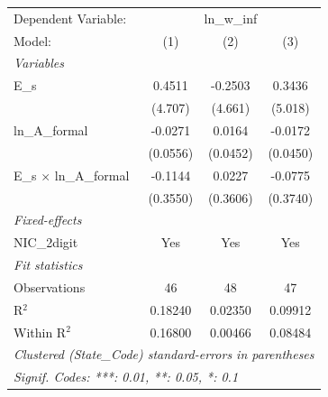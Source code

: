 
\begingroup
\centering
\begin{tabular}{lccc}
   \tabularnewline \midrule \midrule
   Dependent Variable: & \multicolumn{3}{c}{ln\_w\_inf}\\
   Model:                          & (1)      & (2)      & (3)\\  
   \midrule
   \emph{Variables}\\
   E\_s                            & 0.4511   & -0.2503  & 0.3436\\   
                                   & (4.707)  & (4.661)  & (5.018)\\   
   ln\_A\_formal                   & -0.0271  & 0.0164   & -0.0172\\   
                                   & (0.0556) & (0.0452) & (0.0450)\\   
   E\_s $\times$ ln\_A\_formal     & -0.1144  & 0.0227   & -0.0775\\   
                                   & (0.3550) & (0.3606) & (0.3740)\\   
   \midrule
   \emph{Fixed-effects}\\
   NIC\_2digit                     & Yes      & Yes      & Yes\\  
   \midrule
   \emph{Fit statistics}\\
   Observations                    & 46       & 48       & 47\\  
   R$^2$                           & 0.18240  & 0.02350  & 0.09912\\  
   Within R$^2$                    & 0.16800  & 0.00466  & 0.08484\\  
   \midrule \midrule
   \multicolumn{4}{l}{\emph{Clustered (State\_Code) standard-errors in parentheses}}\\
   \multicolumn{4}{l}{\emph{Signif. Codes: ***: 0.01, **: 0.05, *: 0.1}}\\
\end{tabular}
\par\endgroup


